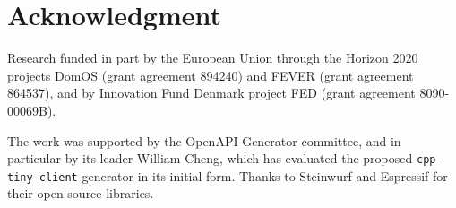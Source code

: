 \documentclass[manuscript,screen]{acmart}
\begin{document}


\section*{Acknowledgment}

Research funded in part by the European Union through the Horizon 2020 projects DomOS (grant agreement 894240) and FEVER (grant agreement 864537), and by Innovation Fund Denmark project FED (grant agreement 8090-00069B).

The work was supported by the OpenAPI Generator committee, and in particular by its leader William Cheng, which has evaluated the proposed \texttt{cpp-tiny-client} generator in its initial form. Thanks to Steinwurf and Espressif for their open source libraries. 









\end{document}
